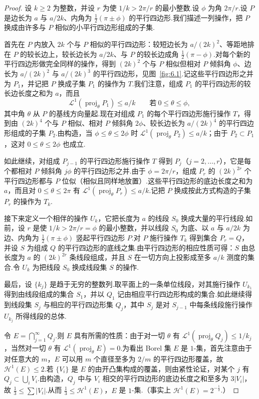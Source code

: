 \begin{proof}
设 $k\geq 2$ 为整数，并设 $r$ 为使 $1/k>2\pi/r$ 的最小整数.设 $\phi$ 为角 $2\pi/r$.设 $P$ 是边长为 $a$ 与 $a/2k$、内角为 $\frac{1}{2}(\pi\pm\phi)$ 的平行四边形.我们描述一列操作，把 $P$ 换成由许多与 $P$ 相似的小平行四边形组成的子集.

首先在 $P$ 内放入 $2k$ 个与 $P$ 相似的平行四边形：较短边长为 $a/(2k)^2$、等距地排在 $P$ 的较长边上，较长边长为 $a/2k$、与 $P$ 的较长边成角 $\frac{1}{2}(\pi-\phi)$.对每个新的平行四边形做完全同样的操作，得到 $(2k)^2$ 个与 $P$ 相似但相对 $P$ 倾斜角 $\phi$、边长为 $a/(2k)^2$ 与 $a/(2k)^3$ 的平行四边形，见图~\ref{fig:6.1}.记这些平行四边形之并为 $P_1$，并记把 $P$ 换成子集 $P_1$ 的操作为 $T$.我们注意，组成 $P_1$ 的平行四边形的较长边长度之和为 $a$，而且
\[
  \mathscr{L}^{1}(\operatorname{proj}_{\theta}P_1)\leq a/k\qquad\text{若}\ 0\leq\theta\leq\phi,
\]
其中角 $\theta$ 从 $P$ 的基线方向量起.现在对组成 $P_1$ 的每个平行四边形施行操作 $T$，得到由 $(2k)^4$ 个与 $P$ 相似、相对 $P$ 倾斜角 $2\phi$、较长边长为 $a/(2k)^4$ 的平行四边形组成的子集 $P_2$.由构造，当 $\phi\leq\theta\leq 2\phi$ 时 $\mathscr{L}^1(\operatorname{proj}_{\theta}P_2)\leq a/k$；由于 $P_2\subset P_1$，这对 $0\leq\theta\leq 2\phi$ 也成立.

如此继续，对组成 $P_{j-1}$ 的平行四边形施行操作 $T$ 得到 $P_j$（$j=2,\ldots,r$），它是每个都相对 $P$ 倾斜角 $j\phi$ 的平行四边形之并.由于 $\phi=2\pi/r$，组成 $P_r$ 的 $(2k)^{2r}$ 个平行四边形都与 $P$ 位似（相似且同样地放置）.这些平行四边形的底边长度之和为 $a$，而且对 $0\leq\theta\leq 2\pi$ 有 $\mathscr{L}^1(\operatorname{proj}_{\theta}P_r)\leq a/k$.记把 $P$ 换成按此方式构造的子集 $P_r$ 的操作为 $T_k$.

接下来定义一个相伴的操作 $U_k$，它把长度为 $a$ 的线段 $S_0$ 换成大量的平行线段.如前，设 $r$ 是使 $1/k>2\pi/r=\phi$ 的最小整数，并以线段 $S_0$ 为底、以 $a$ 与 $a/2k$ 为边、内角为 $\frac{1}{2}(\pi\pm\phi)$ 竖起平行四边形 $P$.对 $P$ 施行操作 $T_k$ 得到集合 $P_r=Q$，并设 $S$ 为组成 $Q$ 的平行四边形的底线之集.由平行四边形的相应性质可得：$S$ 由总长度为 $a$ 的 $(2k)^{2r}$ 条线段组成，并且 $S$ 在一切方向上投影成至多 $a/k$ 测度的集合.令 $U_k$ 为把线段 $S_0$ 换成线段集 $S$ 的操作.

最后，设 $\{k_j\}$ 是趋于无穷的整数列.取平面上的一条单位线段，对其施行操作 $U_{k_1}$ 得到由线段组成的集合 $S_1$，并以 $Q_1$ 记由相应平行四边形构成的集合.如此继续得到线段集 $S_j$ 与相应的平行四边形集 $Q_j$，其中 $S_j$ 是对 $S_{j-1}$ 中每条线段施行操作 $U_{k_j}$ 所得线段的总体.

令 $E=\bigcap_{j=1}^{\infty}Q_j$.则 $E$ 具有所需的性质：由于对一切 $\theta$ 有 $\mathscr{L}^1(\operatorname{proj}_{\theta}Q_j)\leq 1/k_j$，当然对一切 $\theta$ 有 $\mathscr{L}^1(\operatorname{proj}_{\theta}E)=0$.为看出 Borel 集 $E$ 是 $1$-集，首先注意由于对任意大的 $m$，$E$ 可以用 $m$ 个直径至多为 $2/m$ 的平行四边形覆盖，故 $\mathcal{H}^1(E)\leq 2$.若 $\{V_i\}$ 是 $E$ 的由开凸集构成的覆盖，则由紧性论证，对某个 $j$ 有 $Q_j\subset\bigcup_i V_i$.由构造，$Q_j$ 中与 $V_i$ 相交的平行四边形的底边长度之和至多为 $3|V_i|$，故 $\frac{1}{3}\leq\sum|V_i|$.从而 $\frac{1}{3}\leq\mathcal{H}^1(E)$，$E$ 是 $1$-集.（事实上 $\mathcal{H}^1(E)=2^{-\frac{1}{2}}$.）
\end{proof}

